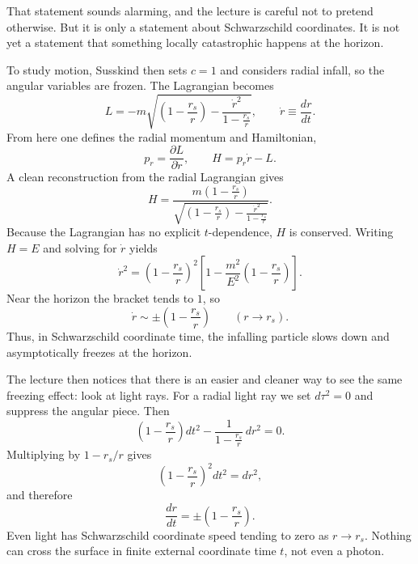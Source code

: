That statement sounds alarming, and the lecture is careful not to pretend otherwise. But it is only a statement about Schwarzschild coordinates. It is not yet a statement that something locally catastrophic happens at the horizon.

To study motion, Susskind then sets \(c=1\) and considers radial infall, so the angular variables are frozen. The Lagrangian becomes
\begin{equation}
L=-m\sqrt{\left(1-\frac{r_s}{r}\right)-\frac{\dot r^2}{1-\frac{r_s}{r}}},
\qquad
\dot r \equiv \frac{dr}{dt}.
\end{equation}
From here one defines the radial momentum and Hamiltonian,
\begin{equation}
p_r=\frac{\partial L}{\partial \dot r},
\qquad
H=p_r\dot r-L.
\end{equation}
A clean reconstruction from the radial Lagrangian gives
\begin{equation}
H
=
\frac{m\left(1-\frac{r_s}{r}\right)}
{\sqrt{\left(1-\frac{r_s}{r}\right)-\frac{\dot r^2}{1-\frac{r_s}{r}}}}.
\end{equation}
Because the Lagrangian has no explicit \(t\)-dependence, \(H\) is conserved. Writing \(H=E\) and solving for \(\dot r\) yields
\begin{equation}
\dot r^2
=
\left(1-\frac{r_s}{r}\right)^2
\left[1-\frac{m^2}{E^2}\left(1-\frac{r_s}{r}\right)\right].
\end{equation}
Near the horizon the bracket tends to \(1\), so
\begin{equation}
\dot r \sim \pm\left(1-\frac{r_s}{r}\right)
\qquad
(r\to r_s).
\end{equation}
Thus, in Schwarzschild coordinate time, the infalling particle slows down and asymptotically freezes at the horizon.

The lecture then notices that there is an easier and cleaner way to see the same freezing effect: look at light rays. For a radial light ray we set \(d\tau^2=0\) and suppress the angular piece. Then
\begin{equation}
\left(1-\frac{r_s}{r}\right)dt^2
-
\frac{1}{1-\frac{r_s}{r}}\,dr^2
=0.
\end{equation}
Multiplying by \(1-r_s/r\) gives
\begin{equation}
\left(1-\frac{r_s}{r}\right)^2dt^2 = dr^2,
\end{equation}
and therefore
\begin{equation}
\frac{dr}{dt}=\pm\left(1-\frac{r_s}{r}\right).
\end{equation}
Even light has Schwarzschild coordinate speed tending to zero as \(r\to r_s\). Nothing can cross the surface in finite external coordinate time \(t\), not even a photon.

